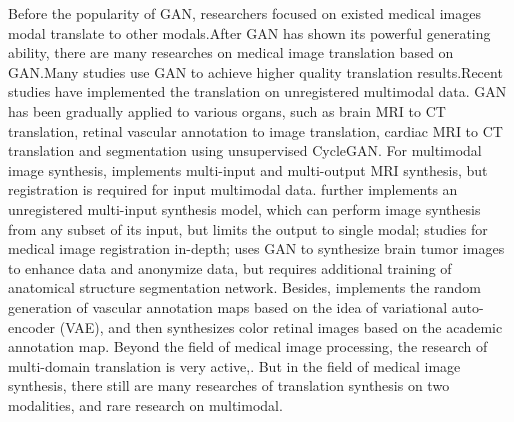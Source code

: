 \documentclass[letterpaper]{article} %
\begin{document}
Before the popularity of GAN, researchers focused on existed medical images modal translate to other modals\cite{22burgos2015robust,33huang2017simultaneous,34vemulapalli2015unsupervised,36vannguyen2015crossdomain}.After GAN has shown its powerful generating ability, there are many researches on medical image translation based on GAN\cite{2zhang2018translating,20nie2017medical,35osokin2017gans,36vannguyen2015crossdomain,40kamnitsas2017unsupervised}.Many studies use GAN to achieve higher quality translation results\cite{1zhao2018modular,5liang2018generative,6zhu2017unpaired,13choi2018stargan:}.Recent studies have implemented the translation on unregistered multimodal data\cite{2zhang2018translating,85joyce2017robust}.
GAN has been gradually applied to various organs, such as brain MRI to CT translation\cite{20nie2017medical,40kamnitsas2017unsupervised}, retinal vascular annotation to image translation\cite{41costa2017towards}, cardiac MRI to CT translation and segmentation using unsupervised CycleGAN\cite{6zhu2017unpaired,20nie2017medical}.
For multimodal image synthesis, \cite{84chartsias2018multimodal} implements multi-input and multi-output MRI synthesis, but registration is required for input multimodal data. \cite{85joyce2017robust} further implements an unregistered multi-input synthesis model, which can perform image synthesis from any subset of its input, but limits the output to single modal;\cite{66Miao2018dilated} studies for medical image registration in-depth;\cite{4shin2018medical} uses GAN to synthesize brain tumor images to enhance data and anonymize data, but requires additional training of anatomical structure segmentation network.
Besides,\cite{41costa2017towards} implements the random generation of vascular annotation maps based on the idea of variational auto-encoder (VAE)\cite{87kingma2014auto-encoding}, and then synthesizes color retinal images based on the academic annotation map.
Beyond the field of medical image processing, the research of multi-domain translation is very active\cite{1zhao2018modular},\cite{5liang2018generative,13choi2018stargan:,27isola2017image-to-image}.
But in the field of medical image synthesis, there still are many researches of translation synthesis on two modalities\cite{2zhang2018translating,20nie2017medical,22burgos2015robust,34vemulapalli2015unsupervised,35osokin2017gans,36vannguyen2015crossdomain,40kamnitsas2017unsupervised}, and rare research on multimodal\cite{84chartsias2018multimodal,85joyce2017robust,4shin2018medical}.
\end{document}
